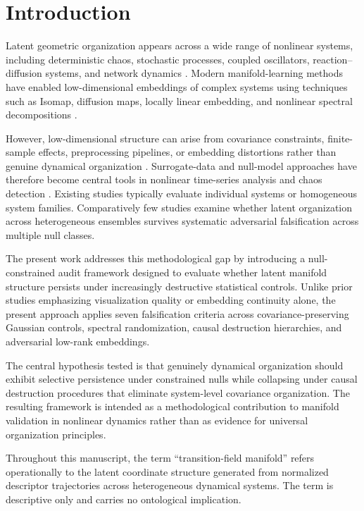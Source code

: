 \documentclass[%
 aip,
 chaos,
 amsmath,amssymb,
 reprint,
]{revtex4-2}
\begin{document}
\section{Introduction}

Latent geometric organization appears across a wide range of nonlinear systems, including deterministic chaos, stochastic processes, coupled oscillators, reaction--diffusion systems, and network dynamics \cite{Lorenz1963, Takens1981, Grassberger1983}. Modern manifold-learning methods have enabled low-dimensional embeddings of complex systems using techniques such as Isomap, diffusion maps, locally linear embedding, and nonlinear spectral decompositions \cite{Tenenbaum2000, Roweis2000, Belkin2003, Coifman2005, McInnes2018}. 

However, low-dimensional structure can arise from covariance constraints, finite-sample effects, preprocessing pipelines, or embedding distortions rather than genuine dynamical organization \cite{Schreiber1999, Kantz2004}. Surrogate-data and null-model approaches have therefore become central tools in nonlinear time-series analysis and chaos detection \cite{Theiler1992, Schreiber1996}. Existing studies typically evaluate individual systems or homogeneous system families. Comparatively few studies examine whether latent organization across heterogeneous ensembles survives systematic adversarial falsification across multiple null classes.

The present work addresses this methodological gap by introducing a null-constrained audit framework designed to evaluate whether latent manifold structure persists under increasingly destructive statistical controls. Unlike prior studies emphasizing visualization quality or embedding continuity alone, the present approach applies seven falsification criteria across covariance-preserving Gaussian controls, spectral randomization, causal destruction hierarchies, and adversarial low-rank embeddings. 

The central hypothesis tested is that genuinely dynamical organization should exhibit selective persistence under constrained nulls while collapsing under causal destruction procedures that eliminate system-level covariance organization. The resulting framework is intended as a methodological contribution to manifold validation in nonlinear dynamics rather than as evidence for universal organization principles.

Throughout this manuscript, the term ``transition-field manifold'' refers operationally to the latent coordinate structure generated from normalized descriptor trajectories across heterogeneous dynamical systems. The term is descriptive only and carries no ontological implication.
\end{document}
